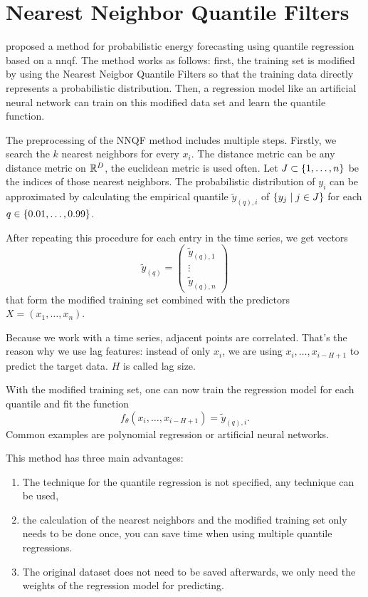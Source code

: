 \section{Nearest Neighbor Quantile Filters}
\label{sec:nnqf}

\Textcite{Ordiano2019} proposed a method for probabilistic 
energy forecasting using quantile regression based on a \gls{nnqf}. 
The method works as follows: first, the training set is modified 
by using the Nearest Neigbor Quantile Filters so that 
the training data directly represents a probabilistic distribution. 
Then, a regression model like an artificial neural network can 
train on this modified data set and learn the quantile function.

The preprocessing of the NNQF method includes multiple steps. 
Firstly, we search the \(k\) nearest neighbors 
for every \(x_i\).
The distance metric can be any distance metric on \(\mathbb{R}^D\), 
the euclidean metric is used often.
Let \(J \subset \{1, \ldots, n\}\) be the indices of 
those nearest neighbors. 
The probabilistic distribution of \(y_i\) can be approximated 
by calculating the empirical quantile \(\tilde{y}_{(q),i}\) of 
\(\{y_j \;|\; j\in J\}\) for each \(q \in \{0.01, \ldots, 0.99\}\). 

After repeating this procedure for each entry in the time series, 
we get vectors 
\[ \tilde{y}_{(q)} = \begin{pmatrix}
    \tilde{y}_{(q), 1} \\ 
    \vdots \\
    \tilde{y}_{(q), n}
\end{pmatrix} \]
that form the modified training set combined with the 
predictors \(X = (x_1, \ldots, x_n)\).

Because we work with a time series, adjacent points are correlated. 
That's the reason why we use lag features: 
instead of only \(x_i\), we are using \(x_i, \ldots, x_{i-H+1}\) to 
predict the target data. \(H\) is called lag size.

With the modified training set, one can now train the regression model 
for each quantile and fit the function 
\[ f_\theta(x_i, \ldots, x_{i-H+1}) = \tilde{y}_{(q), i}. \]
Common examples are polynomial regression or 
artificial neural networks. 

This method has three main advantages: 
\begin{enumerate}
    \item The technique for the quantile regression is not specified, 
    any technique can be used,
    \item the calculation of the nearest neighbors and the modified 
    training set only needs to be done once, you can save time when 
    using multiple quantile regressions. 
    \item The original dataset does not need to be saved afterwards, 
    we only need the weights of the regression model for predicting.
\end{enumerate}

